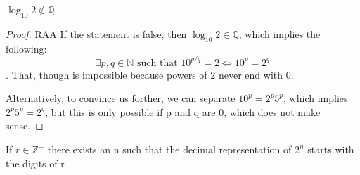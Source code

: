 \begin{lemma}
    $\log_{10}2\notin\mathbb{Q}$
\end{lemma}
\begin{proof}
    RAA If the statement is false, then $\log_{10}2\in\mathbb{Q}$, which implies the following: \begin{equation*}
        \exists p,q\in\mathbb{N}\text{ such that }10^{p/q}=2\iff 10^p=2^q
    \end{equation*}. 
    That, though is impossible because powers of 2 never end with 0. 
    
    Alternatively, to convince us forther, we can separate $10^p=2^p5^p$, which implies $2^p5^p=2^q$, but this is only possible if p and q are 0, which does not make sense.
\end{proof}

\begin{proposition}
    If $r\in\mathbb{Z}^+$ there exists an n such that the decimal representation of $2^n$ starts with the digits of r
\end{proposition}
